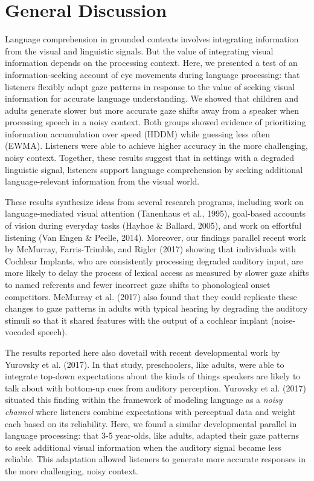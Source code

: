 \documentclass[english,floatsintext,man]{apa6}
\theoremstyle{definition}
\theoremstyle{definition}
\theoremstyle{definition}
\theoremstyle{remark}
\begin{document}
\hypertarget{general-discussion}{%
\section{General Discussion}\label{general-discussion}}

Language comprehension in grounded contexts involves integrating
information from the visual and linguistic signals. But the value of
integrating visual information depends on the processing context. Here,
we presented a test of an information-seeking account of eye movements
during language processing: that listeners flexibly adapt gaze patterns
in response to the value of seeking visual information for accurate
language understanding. We showed that children and adults generate
slower but more accurate gaze shifts away from a speaker when processing
speech in a noisy context. Both groups showed evidence of prioritizing
information accumulation over speed (HDDM) while guessing less often
(EWMA). Listeners were able to achieve higher accuracy in the more
challenging, noisy context. Together, these results suggest that in
settings with a degraded linguistic signal, listeners support language
comprehension by seeking additional language-relevant information from
the visual world.

These results synthesize ideas from several research programs, including
work on language-mediated visual attention (Tanenhaus et al., 1995),
goal-based accounts of vision during everyday tasks (Hayhoe \& Ballard,
2005), and work on effortful listening (Van Engen \& Peelle, 2014).
Moreover, our findings parallel recent work by McMurray, Farris-Trimble,
and Rigler (2017) showing that individuals with Cochlear Implants, who
are consistently processing degraded auditory input, are more likely to
delay the process of lexical access as measured by slower gaze shifts to
named referents and fewer incorrect gaze shifts to phonological onset
competitors. McMurray et al. (2017) also found that they could replicate
these changes to gaze patterns in adults with typical hearing by
degrading the auditory stimuli so that it shared features with the
output of a cochlear implant (noise-vocoded speech).

The results reported here also dovetail with recent developmental work
by Yurovsky et al. (2017). In that study, preschoolers, like adults,
were able to integrate top-down expectations about the kinds of things
speakers are likely to talk about with bottom-up cues from auditory
perception. Yurovsky et al. (2017) situated this finding within the
framework of modeling language as a \emph{noisy channel} where listeners
combine expectations with perceptual data and weight each based on its
reliability. Here, we found a similar developmental parallel in language
processing: that 3-5 year-olds, like adults, adapted their gaze patterns
to seek additional visual information when the auditory signal became
less reliable. This adaptation allowed listeners to generate more
accurate responses in the more challenging, noisy context.
\end{document}
